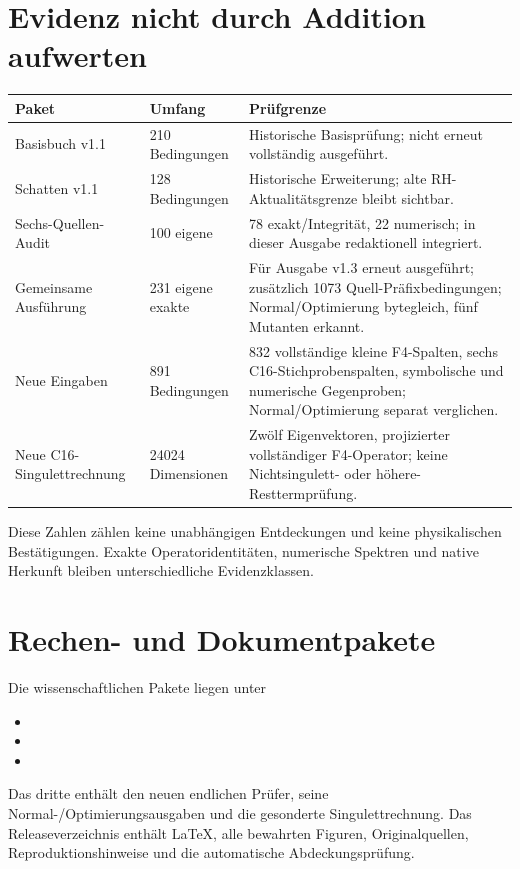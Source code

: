 \section{Evidenz nicht durch Addition aufwerten}
\begin{longtable}{L{37mm}L{30mm}L{83mm}}
\toprule Paket&Umfang&Prüfgrenze\\\midrule\endhead
Basisbuch v1.1&210 Bedingungen&Historische Basisprüfung; nicht erneut vollständig ausgeführt.\\
Schatten v1.1&128 Bedingungen&Historische Erweiterung; alte RH-Aktualitätsgrenze bleibt sichtbar.\\
Sechs-Quellen-Audit&100 eigene&78 exakt/Integrität, 22 numerisch; in dieser Ausgabe redaktionell integriert.\\
Gemeinsame Ausführung&231 eigene exakte&Für Ausgabe v1.3 erneut ausgeführt; zusätzlich 1073 Quell-Präfixbedingungen; Normal/Optimierung bytegleich, fünf Mutanten erkannt.\\
Neue Eingaben&891 Bedingungen&832 vollständige kleine F4-Spalten, sechs C16-Stichprobenspalten, symbolische und numerische Gegenproben; Normal/Optimierung separat verglichen.\\
Neue C16-Singulettrechnung&24024 Dimensionen&Zwölf Eigenvektoren, projizierter vollständiger F4-Operator; keine Nichtsingulett- oder höhere-Resttermprüfung.\\\bottomrule
\end{longtable}
Diese Zahlen zählen keine unabhängigen Entdeckungen und keine physikalischen Bestätigungen. Exakte Operatoridentitäten, numerische Spektren und native Herkunft bleiben unterschiedliche Evidenzklassen.

\section{Rechen- und Dokumentpakete}
Die wissenschaftlichen Pakete liegen unter
\begin{itemize}
\item {}
\item {}
\item {}
\end{itemize}
Das dritte enthält den neuen endlichen Prüfer, seine Normal-/Optimierungsausgaben und die gesonderte Singulettrechnung. Das Releaseverzeichnis enthält LaTeX, alle bewahrten Figuren, Originalquellen, Reproduktionshinweise und die automatische Abdeckungsprüfung.

